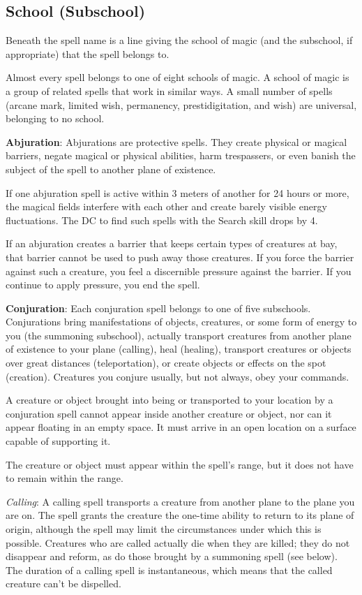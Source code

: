 \subsection{School (Subschool)}
Beneath the spell name is a line giving the school of magic (and the subschool, if appropriate) that the spell belongs to.

Almost every spell belongs to one of eight schools of magic. A school of magic is a group of related spells that work in similar ways. A small number of spells (arcane mark, limited wish, permanency, prestidigitation, and wish) are universal, belonging to no school.

\textbf{Abjuration}: Abjurations are protective spells. They create physical or magical barriers, negate magical or physical abilities, harm trespassers, or even banish the subject of the spell to another plane of existence.

If one abjuration spell is active within 3 meters of another for 24 hours or more, the magical fields interfere with each other and create barely visible energy fluctuations. The DC to find such spells with the Search skill drops by 4.

If an abjuration creates a barrier that keeps certain types of creatures at bay, that barrier cannot be used to push away those creatures. If you force the barrier against such a creature, you feel a discernible pressure against the barrier. If you continue to apply pressure, you end the spell.

\textbf{Conjuration}: Each conjuration spell belongs to one of five subschools. Conjurations bring manifestations of objects, creatures, or some form of energy to you (the summoning subschool), actually transport creatures from another plane of existence to your plane (calling), heal (healing), transport creatures or objects over great distances (teleportation), or create objects or effects on the spot (creation). Creatures you conjure usually, but not always, obey your commands.

A creature or object brought into being or transported to your location by a conjuration spell cannot appear inside another creature or object, nor can it appear floating in an empty space. It must arrive in an open location on a surface capable of supporting it.

The creature or object must appear within the spell's range, but it does not have to remain within the range.

\textit{Calling}: A calling spell transports a creature from another plane to the plane you are on. The spell grants the creature the one-time ability to return to its plane of origin, although the spell may limit the circumstances under which this is possible. Creatures who are called actually die when they are killed; they do not disappear and reform, as do those brought by a summoning spell (see below). The duration of a calling spell is instantaneous, which means that the called creature can't be dispelled.

